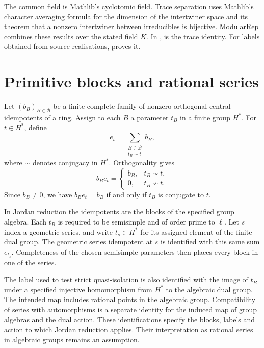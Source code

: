 \begin{implementation}
The common field is Mathlib's cyclotomic field. Trace separation uses
Mathlib's character averaging formula for the dimension of the intertwiner
space and its theorem that a nonzero intertwiner between irreducibles is
bijective. ModularRep combines these results over the stated field $K$.
In ,
 is the trace identity.
For labels obtained from source realisations,
 proves it.
\end{implementation}

\section{Primitive blocks and rational series}

Let $(b_B)_{B\in\mathcal B}$ be a finite complete family of nonzero
orthogonal central idempotents of a ring. Assign to each $B$ a parameter
$t_B$ in a finite group $H^*$. For $t\in H^*$, define
\[
 e_t=\sum_{\substack{B\in\mathcal B\\t_B\sim t}} b_B,
\]
where $\sim$ denotes conjugacy in $H^*$. Orthogonality gives
\[
 b_Be_t=
 \begin{cases}
 b_B,&t_B\sim t,\\
 0,&t_B\not\sim t.
 \end{cases}
\]
Since $b_B\ne0$, we have $b_Be_t=b_B$ if and only if $t_B$ is
conjugate to $t$.

In Jordan reduction the idempotents are the blocks of the
specified group algebra. Each $t_B$ is required to be semisimple and of
order prime to $\ell$. Let $s$ index a geometric series, and write $t_s\in H^*$ for its
assigned element of the finite dual group. The geometric series idempotent at $s$ is identified
with this same sum $e_{t_s}$. Completeness of the chosen semisimple
parameters then places every block in one of the series.

The label used to test strict quasi-isolation is also identified with
the image of $t_B$ under a specified injective homomorphism from $H^*$
to the algebraic dual group. The intended map includes rational points
in the algebraic group. Compatibility of series with automorphisms is a
separate identity for the induced map of group algebras and the dual action.
These identifications specify the blocks, labels and action to which
Jordan reduction applies. Their interpretation as rational series in
algebraic groups remains an assumption.

